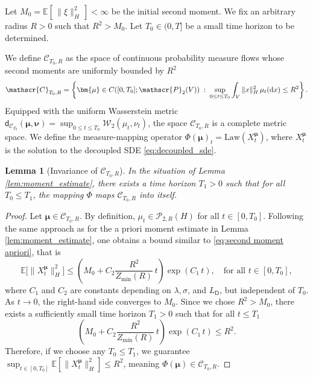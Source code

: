 \documentclass[12pt]{amsart}
\newcommand{\D}[1]{\mbox{\rm #1}}
\newcommand{\dd}{\D{d}}
\numberwithin{equation}{section}
\newtheorem{lemma}[theorem]{Lemma}
\begin{document}
Let $M_0 = \mathbb{E}[\,\|\xi\|_H^2\,] < \infty$ be the initial second moment. We fix an arbitrary radius $R > 0$ such that $R^2 > M_0$. Let $T_0 \in (0, T]$ be a small time horizon to be determined. 

We define $\mathscr{C}_{T_0, R}$ as the space of continuous probability measure flows whose second moments are uniformly bounded by $R^2$ 
\begin{equation}\label{invariant ball}
    \mathscr{C}_{T_0, R} = \left\{ {\bm{\mu}} \in C([0,T_0]; \mathscr{P}_2(V))\; : \; \sup_{0 \leq t \leq T_0} \int_V \|x\|_H^2 \,\mu_t(\dd x) \leq R^2 \right\}.
\end{equation}
Equipped with the uniform Wasserstein metric $\mathsf{d}_{\mathscr{C}_{T_0}}({\bm{\mu}}, {\bm{\nu}}) = \sup_{0 \leq t \leq T_0} \mathcal{W}_2(\mu_t, \nu_t)$, the space $\mathscr{C}_{T_0, R}$ is a complete metric space. We define the measure-mapping operator $\Phi({\bm{\mu}})_t = \mathrm{Law}(X^{\bm{\mu}}_t)$, where $X^{\bm{\mu}}_t$ is the solution to the decoupled SDE \eqref{eq:decoupled_sde}.






\begin{lemma}[Invariance of $\mathscr{C}_{T_0, R}$]
\label{lem:invariance}
In the situation of Lemma \ref{lem:moment_estimate}, 
there exists a time horizon $T_1 > 0$ such that for all $T_0 \leq T_1$, the mapping $\Phi$ maps $\mathscr{C}_{T_0, R}$ into itself.
\end{lemma}


\begin{proof}
Let ${\bm{\mu}} \in \mathscr{C}_{T_0, R}$. By definition, $\mu_t \in \mathscr{P}_{2,R}(H)$ for all $t \in [0, T_0]$. Following the same approach as for the a priori moment estimate in Lemma \ref{lem:moment_estimate}, one obtains a bound similar to \eqref{eq:second moment apriori}, that is
\begin{equation*}
    \mathbb{E}\big[\|X^{\bm{\mu}}_t\|_H^2\big] \leq \left( M_0 + C_2 \frac{R^2}{Z_{\min}(R)} \, t \right) \exp(C_1 \,t), \quad \text{for all } t \in [0, T_0],
\end{equation*}
where $C_1$ and $C_2$ are constants depending on $\lambda, \sigma$, and $L_{\mathsf{D}}$, but independent of $T_0$. 
As $t \to 0$, the right-hand side converges  to $M_0$. Since we chose $R^2 > M_0$, there exists a sufficiently small time horizon $T_1 > 0$ such that for all $t \leq T_1$
\begin{equation*}
    \left( M_0 + C_2 \frac{R^2}{Z_{\min}(R)}\, t \right) \exp(C_1 \,t) \leq R^2.
\end{equation*}
Therefore, if we choose any $T_0 \leq T_1$, we guarantee $\sup_{t \in [0, T_0]} \mathbb{E}[\|X^{\bm{\mu}}_t\|_H^2] \leq R^2$, meaning $\Phi({\bm{\mu}}) \in \mathscr{C}_{T_0, R}$.
\end{proof}
\end{document}
